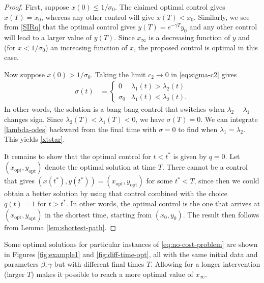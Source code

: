 \documentclass[english,12pt,letter]{article}
\newcommand{\Rnot}{\sigma_0}
\newcommand{\Sinf}{x_\infty}
\newcommand{\xopt}{x_\text{opt}}
\newcommand{\yopt}{y_\text{opt}}
\begin{document}
\begin{proof}
First, suppose $x(0)\le1/\sigma_0$.  The claimed optimal control gives $x(T)=x_0$, whereas
any other control will give $x(T)<x_0$.  Similarly, we see from \eqref{SIRq} that
the optimal control gives $y(T)=e^{-\gamma T}y_0$ and any other control will
lead to a larger value of $y(T)$.  Since $\Sinf$ is a decreasing function of $y$ and
(for $x<1/\Rnot$) an increasing function of $x$, the proposed control is optimal in this case.

Now suppose $x(0)>1/\sigma_0$.  Taking the limit $c_2\to 0$ in \eqref{eq:sigma-c2} gives
\begin{align}
    \sigma(t) & = \begin{cases} 0 & \lambda_1(t)>\lambda_2(t) \\ \sigma_0 & \lambda_1(t) < \lambda_2(t). \end{cases}
\end{align}
In other words, the solution is a bang-bang control that switches when $\lambda_2-\lambda_1$ changes sign.
Since $\lambda_2(T)<\lambda_1(T)<0$, we have $\sigma(T)=0$.  We can integrate \eqref{lambda-odes} backward from the final
time with $\sigma=0$ to find when $\lambda_1=\lambda_2$.  This yields \eqref{xtstar}.

It remains to show that the optimal control for $t<t^*$ is given by $q=0$.  
Let $(\xopt,\yopt)$ denote the optimal solution at time $T$.  There cannot be a
control that gives $(x(t^*),y(t^*)) = (\xopt,\yopt)$ for some $t^*<T$, since then
we could obtain a better solution by using that control combined with the choice
$q(t)=1$ for $t>t^*$.  In other words,
the optimal control is the one that arrives at $(\xopt,\yopt)$ in the shortest time,
starting from $(x_0,y_0)$.  The result then follows from Lemma \ref{lem:shortest-path}.
\end{proof}

Some optimal solutions for particular instances of \eqref{eq:no-cost-problem}
are shown in Figures \ref{fig:example1} and \ref{fig:diff-time-opt},
all with the same initial data and parameters $\beta, \gamma$ but with different final
times $T$.  Allowing for a longer intervention (larger $T$) makes it possible to reach
a more optimal value of $\Sinf$.
\end{document}
